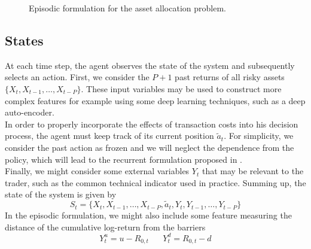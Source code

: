 \begin{figure}[t]
\centering 
{}
\caption{Episodic formulation for the asset allocation problem.}
\label{fig:episodic_asset_alloc}
\end{figure}

\subsection{States}
At each time step, the agent observes the state of the system and subsequently selects an action. First, we consider the $P+1$ past returns of all risky assets $\{X_t, X_{t-1}, \ldots, X_{t-P}\}$. These input variables may be used to construct more complex features for example using some deep learning techniques, such as a deep auto-encoder.\\
In order to properly incorporate the effects of transaction costs into his decision process, the agent must keep track of its current position $\tilde{a}_t$. For simplicity, we consider the past action as frozen and we will neglect the dependence from the policy, which will lead to the recurrent formulation proposed in \cite{moody1997optimization}.\\
Finally, we might consider some external variables $Y_t$ that may be relevant to the trader, such as the common technical indicator used in practice. Summing up, the state of the system is given by
\begin{equation}
	S_t = \{X_t, X_{t-1}, \ldots, X_{t-P}, \tilde{a}_t, Y_t, Y_{t-1}, \ldots,
	Y_{t-P}\}
\end{equation}
In the episodic formulation, we might also include some feature measuring the distance of the cumulative log-return from the barriers
\begin{equation}
	Y_t^u = u - R_{0,t} \;\;\;\;\;\; Y_t^d = R_{0,t} - d
\end{equation}

